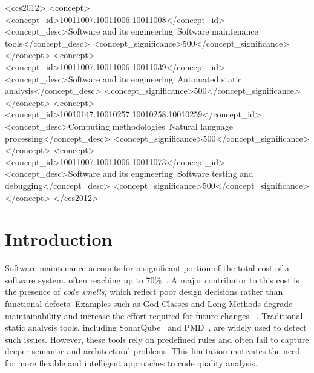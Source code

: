 \documentclass[sigconf,review,anonymous]{acmart}
\begin{document}
\begin{CCSXML}
<ccs2012>
 <concept>
  <concept_id>10011007.10011006.10011008</concept_id>
  <concept_desc>Software and its engineering~Software maintenance tools</concept_desc>
  <concept_significance>500</concept_significance>
 </concept>
 <concept>
  <concept_id>10011007.10011006.10011039</concept_id>
  <concept_desc>Software and its engineering~Automated static analysis</concept_desc>
  <concept_significance>500</concept_significance>
 </concept>
 <concept>
  <concept_id>10010147.10010257.10010258.10010259</concept_id>
  <concept_desc>Computing methodologies~Natural language processing</concept_desc>
  <concept_significance>500</concept_significance>
 </concept>
 <concept>
  <concept_id>10011007.10011006.10011073</concept_id>
  <concept_desc>Software and its engineering~Software testing and debugging</concept_desc>
  <concept_significance>500</concept_significance>
 </concept>
</ccs2012>
\end{CCSXML}




\maketitle

\section{Introduction}

Software maintenance accounts for a significant portion of the total cost of a software system, often reaching up to 70\%~\cite{sommerville2015}. A major contributor to this cost is the presence of \emph{code smells}, which reflect poor design decisions rather than functional defects. Examples such as God Classes and Long Methods degrade maintainability and increase the effort required for future changes ~\cite{refactoring}. Traditional static analysis tools, including SonarQube~\cite{sonarqube} and PMD~\cite{pmd}, are widely used to detect such issues. However, these tools rely on predefined rules and often fail to capture deeper semantic and architectural problems. This limitation motivates the need for more flexible and intelligent approaches to code quality analysis.
\end{document}

